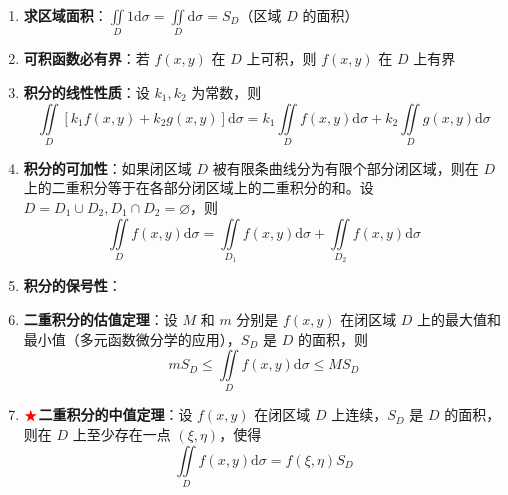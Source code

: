 \documentclass[../book.tex]{subfiles}
\begin{document}
    \begin{enumerate}
        \item \textbf{求区域面积}：$\displaystyle\iint\limits_D 1 \mathrm{d}\sigma = \iint\limits_D \mathrm{d}\sigma = S_D$（区域 $D$ 的面积）

        \item \textbf{可积函数必有界}：若 $f(x,y)$ 在 $D$ 上可积，则 $f(x,y)$ 在 $D$ 上有界

        \item \textbf{积分的线性性质}：设 $k_1, k_2$ 为常数，则
        \[
            \iint\limits_D [k_1 f(x,y) + k_2 g(x,y)] \mathrm{d}\sigma = k_1 \iint\limits_D f(x,y) \mathrm{d}\sigma + k_2 \iint\limits_D g(x,y) \mathrm{d}\sigma
        \]

        \item \textbf{积分的可加性}：如果闭区域 $D$ 被有限条曲线分为有限个部分闭区域，则在 $D$ 上的二重积分等于在各部分闭区域上的二重积分的和。设 $D = D_1 \cup D_2, D_1 \cap D_2 = \varnothing$，则
        \[
            \iint\limits_D f(x,y) \mathrm{d}\sigma = \iint\limits_{D_1} f(x,y) \mathrm{d}\sigma + \iint\limits_{D_2} f(x,y) \mathrm{d}\sigma
        \]

        \item \textbf{积分的保号性}：

        \item \textbf{二重积分的估值定理}：设 $M$ 和 $m$ 分别是 $f(x,y)$ 在闭区域 $D$ 上的最大值和最小值（多元函数微分学的应用），$S_D$ 是 $D$ 的面积，则
        \[
            mS_D \leq \iint\limits_D f(x,y) \mathrm{d}\sigma \leq MS_D
        \]

        \item $\color{red}{\bigstar}$\textbf{二重积分的中值定理}：设 $f(x,y)$ 在闭区域 $D$ 上连续，$S_D$ 是 $D$ 的面积，则在 $D$ 上至少存在一点 $(\xi, \eta)$，使得
        \[
            \iint\limits_D f(x,y) \mathrm{d}\sigma = f(\xi, \eta) S_D
        \]
    \end{enumerate}
\end{document}
